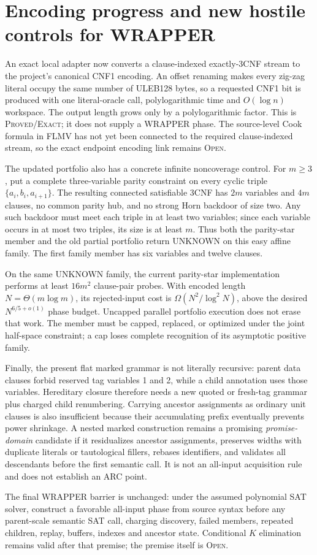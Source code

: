 \section{Encoding progress and new hostile controls for WRAPPER}

An exact local adapter now converts a clause-indexed exactly-3CNF stream to
the project's canonical CNF1 encoding.  An offset renaming makes every
zig-zag literal occupy the same number of ULEB128 bytes, so a requested CNF1
bit is produced with one literal-oracle call, polylogarithmic time and
$O(\log n)$ workspace.  The output length grows only by a polylogarithmic
factor.  This is \textsc{Proved/Exact}; it does not supply a WRAPPER phase.
The source-level Cook formula in FLMV has not yet been connected to the
required clause-indexed stream, so the exact endpoint encoding link remains
\textsc{Open}.

The updated portfolio also has a concrete infinite noncoverage control.  For
$m\ge3$, put a complete three-variable parity constraint on every cyclic
triple $\{a_i,b_i,a_{i+1}\}$.  The resulting connected satisfiable 3CNF has
$2m$ variables and $4m$ clauses, no common parity hub, and no strong Horn
backdoor of size two.  Any such backdoor must meet each triple in at least two
variables; since each variable occurs in at most two triples, its size is at
least $m$.  Thus both the parity-star member and the old partial portfolio
return UNKNOWN on this easy affine family.  The first family member has six
variables and twelve clauses.

On the same UNKNOWN family, the current parity-star implementation performs
at least $16m^2$ clause-pair probes.  With encoded length
$N=\Theta(m\log m)$, its rejected-input cost is
$\Omega(N^2/\log^2N)$, above the desired $N^{6/5+o(1)}$ phase budget.
Uncapped parallel portfolio execution does not erase that work.  The member
must be capped, replaced, or optimized under the joint half-space constraint;
a cap loses complete recognition of its asymptotic positive family.

Finally, the present flat marked grammar is not literally recursive: parent
data clauses forbid reserved tag variables 1 and 2, while a child annotation
uses those variables.  Hereditary closure therefore needs a new quoted or
fresh-tag grammar plus charged child renumbering.  Carrying ancestor
assignments as ordinary unit clauses is also insufficient because their
accumulating prefix eventually prevents power shrinkage.  A nested marked
construction remains a promising \emph{promise-domain} candidate if it
residualizes ancestor assignments, preserves widths with duplicate literals
or tautological fillers, rebases identifiers, and validates all descendants
before the first semantic call.  It is not an all-input acquisition rule and
does not establish an ARC point.

The final WRAPPER barrier is unchanged: under the assumed polynomial SAT
solver, construct a favorable all-input phase from source syntax before any
parent-scale semantic SAT call, charging discovery, failed members, repeated
children, replay, buffers, indexes and ancestor state.  Conditional $K$
elimination remains valid after that premise; the premise itself is
\textsc{Open}.


